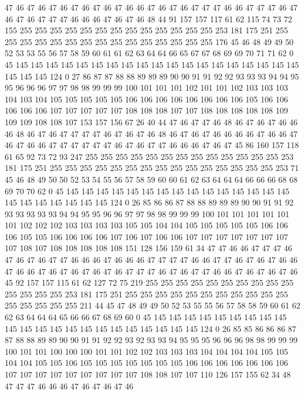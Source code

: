 47 46 47 46 47 46 47 46 47 46 47 46 46 47 46 47 46 47 47 47
46 46 47 47 47 46 47 46 47 46 47 47 47 46 46 46 47 46 47 46
48 44 91 157 157 117 61 62 115 74 73 72 155 255 255 255 255 255 255 255
255 255 255 255 255 255 253 181 175 251 255 255 255 255 255 255 255 255 255 255
255 255 255 255 255 176 45 46 48 49 49 50 52 53 53 55 56 57 58 59
60 61 61 62 63 64 64 66 65 67 67 68 69 69 70 71 71 62 0 45
145 145 145 145 145 145 145 145 145 145 145 145 145 145 145 145 145 145 145 145
145 145 124 0 27 86 87 87 88 88 89 89 89 90 90 91 91 92 92 93
93 93 94 94 95 95 96 96 96 97 97 98 98 99 99 99 100 101 101 101
102 101 101 102 103 103 103 104 103 104 105 105 105 105 105 106 106 106 106 106
106 106 106 105 106 106 106 106 106 107 107 107 107 107 108 108 108 107 107 108
108 108 108 108 109 109 109 108 108 107 153 157 156 67 26 40 44 47 46 47
47 46 48 46 47 46 47 46 46 46 48 46 47 46 47 47 47 47 46 47
46 47 46 48 46 47 46 47 46 46 46 46 47 46 46 47 46 47 46 46
47 47 47 47 47 47 46 47 46 47 47 46 46 46 47 46 47 45 86 160
157 118 61 65 92 73 72 93 247 255 255 255 255 255 255 255 255 255 255 255
255 255 253 181 175 251 255 255 255 255 255 255 255 255 255 255 255 255 255 255
255 253 71 45 46 48 49 50 50 52 53 54 55 56 57 58 59 60 60 61
62 63 64 64 64 66 66 66 68 68 69 70 70 62 0 45 145 145 145 145
145 145 145 145 145 145 145 145 145 145 145 145 145 145 145 145 145 145 124 0
26 85 86 86 87 88 88 89 89 89 90 90 91 91 92 93 93 93 93 93
94 94 95 95 96 96 97 97 98 98 99 99 99 100 101 101 101 101 101 101
102 102 102 103 103 103 103 105 105 104 104 105 105 105 105 105 106 106 106 105
105 106 106 106 106 107 106 107 106 106 107 107 107 107 107 107 107 107 108 107
108 108 108 108 108 151 128 156 159 61 34 47 47 46 46 47 47 47 46 47
46 47 46 47 47 46 46 46 47 46 46 46 47 47 47 47 46 46 47 47
46 47 46 47 46 46 47 46 46 47 46 47 46 47 46 47 46 47 47 47
46 47 46 47 47 46 46 47 46 47 46 47 46 45 92 157 157 115 61 62
127 72 75 219 255 255 255 255 255 255 255 255 255 255 255 255 255 255 253 181
175 251 255 255 255 255 255 255 255 255 255 255 255 255 255 255 255 255 211 44
45 47 48 49 49 50 52 53 55 55 56 57 58 58 59 60 61 62 62 63
64 64 64 65 66 66 67 68 69 60 0 45 145 145 145 145 145 145 145 145
145 145 145 145 145 145 145 145 145 145 145 145 145 145 124 0 26 85 85 86
86 86 87 87 88 88 89 89 90 90 91 91 92 92 93 92 93 93 94 95
95 95 96 96 96 98 98 99 99 99 100 101 101 100 100 100 101 101 102 102
103 103 103 104 104 104 104 105 105 104 104 105 105 106 105 105 105 105 105 105
105 106 106 106 106 106 106 106 107 107 107 107 107 107 107 107 107 108 108 107
107 110 126 157 155 62 34 48 47 47 47 46 46 46 47 46 47 46 47 46
